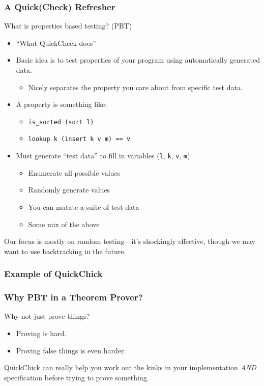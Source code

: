 \documentclass{beamer}
\begin{document}
\begin{frame}
  \frametitle{A Quick(Check) Refresher}

  What is properties based testing? (PBT)

  \begin{itemize}
  \item ``What QuickCheck does''
  \item Basic idea is to test properties of your program using
    automatically generated data.
    \begin{itemize}
    \item Nicely separates the property you care about from specific
      test data.
    \end{itemize}
  \item A property is something like:
    \begin{itemize}
    \item {\tt is\_sorted (sort l)}
    \item {\tt lookup k (insert k v m) == v}
    \end{itemize}
  \item Must generate ``test data'' to fill in variables ({\tt l}, {\tt k}, {\tt v}, {\tt m}):
    \begin{itemize}
    \item Enumerate all possible values
    \item Randomly generate values
    \item You can mutate a suite of test data~\cite{10.1145/3360607}
    \item Some mix of the above
    \end{itemize}
  \end{itemize}
  
  \pause
  
  Our focus is mostly on random testing---it's shockingly effective,
  though we may want to use backtracking in the future.
\end{frame}

\begin{frame}
  \frametitle{Example of QuickChick}


\end{frame}

\begin{frame}
  \frametitle{Why PBT in a Theorem Prover?}

  Why not just prove things?

  \begin{itemize}
  \item Proving is hard.
    \pause
  \item Proving false things is even harder.
  \end{itemize}

  QuickChick can really help you work out the kinks in your
  implementation \emph{AND} specification before trying to prove something.
\end{frame}
\end{document}
